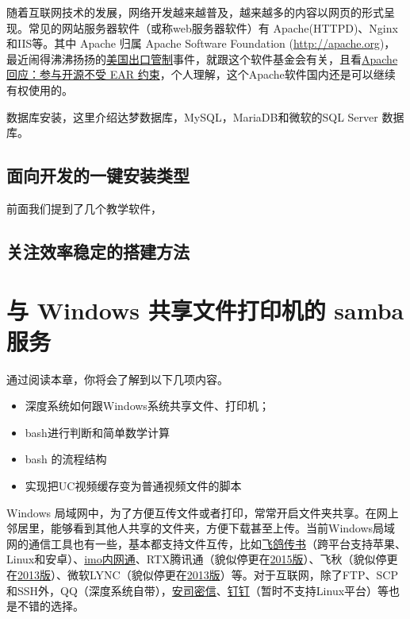 \documentclass[doctor,openright,twoside]{sjtuthesis}
\providecommand{\tightlist}{%
    \setlength{\itemsep}{0pt}\setlength{\parskip}{0pt}}
\theoremstyle{plain}
\theoremstyle{definition}
\theoremstyle{remark}
\theoremstyle{ocrenumbox}
\theoremstyle{plain}
\begin{document}
随着互联网技术的发展，网络开发越来越普及，越来越多的内容以网页的形式呈现。常见的网站服务器软件（或称web服务器软件）有 Apache(HTTPD)、Nginx和IIS等。其中 Apache 归属 Apache Software Foundation (\url{http://apache.org})，最近闹得沸沸扬扬的\href{https://www.oschina.net/news/106863/what-about-ear-and-asf}{美国出口管制}事件，就跟这个软件基金会有关，且看\href{https://blogs.apache.org/foundation/entry/statement-by-the-apache-software}{Apache 回应：参与开源不受 EAR 约束}，个人理解，这个Apache软件国内还是可以继续有权使用的。

数据库安装，这里介绍达梦数据库，MySQL，MariaDB和微软的SQL Server 数据库。

\hypertarget{section-120}{%
\section{面向开发的一键安装类型}\label{section-120}}

前面我们提到了几个教学软件，

\hypertarget{section-121}{%
\section{关注效率稳定的搭建方法}\label{section-121}}

\hypertarget{windows--samba-}{%
\chapter{\texorpdfstring{与 Windows 共享文件打印机的 samba 服务}{与 Windows 共享文件打印机的 samba 服务}}\label{windows--samba-}}

通过阅读本章，你将会了解到以下几项内容。

\begin{itemize}
\tightlist
\item
  深度系统如何跟Windows系统共享文件、打印机；
\item
  bash进行判断和简单数学计算
\item
  bash 的流程结构
\item
  实现把UC视频缓存变为普通视频文件的脚本
\end{itemize}

Windows 局域网中，为了方便互传文件或者打印，常常开启文件夹共享。在网上邻居里，能够看到其他人共享的文件夹，方便下载甚至上传。当前Windows局域网的通信工具也有一些，基本都支持文件互传，比如\href{http://www.feige360.com}{飞鸽传书}（跨平台支持苹果、Linux和安卓）、\href{www.imoffice.com}{imo内网通}、RTX腾讯通（貌似停更在\href{https://rtx.tencent.com/rtx/download/index.shtml}{2015版}）、飞秋（貌似停更在\href{http://bbs.feiq18.com/config_nav.php?id=19}{2013版}）、微软LYNC（貌似停更在\href{https://products.office.com/en-us/previous-versions/microsoft-lync-2013}{2013版}）等。对于互联网，除了FTP、SCP和SSH外，QQ（深度系统自带），\href{http://akey.me/}{安司密信}、\href{https://www.dingtalk.com/}{钉钉}（暂时不支持Linux平台）等也是不错的选择。
\end{document}
